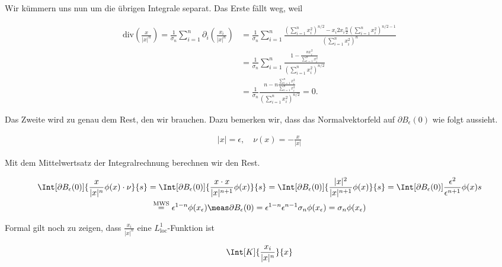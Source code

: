 \begin{solution}
Wir kümmern uns nun um die übrigen Integrale separat.
Das Erste fällt weg, weil

\begin{align*}
  \mathrm{div}\left(\frac{x}{|x|^n}\right)
  =\frac{1}{\sigma_n}\sum_{i=1}^n\partial_i\left(\frac{x_i}{|x|^n}\right)
  &= \frac{1}{\sigma_n}\sum_{i=1}^n\frac{\left(\sum_{i=1}^nx_i^2\right)^{n/2} - x_i2x_i\frac{n}{2}\left(\sum_{i=1}^nx_i^2\right)^{n/2 - 1}}{\left(\sum_{i=1}^nx_i^2\right)^n} \\
  &= \frac{1}{\sigma_n}\sum_{i=1}^n\frac{1 - \frac{nx_i^2}{\sum_{i=1}^nx_i^2}}{\left(\sum_{i=1}^nx_i^2\right)^{n/2}} \\
  &= \frac{1}{\sigma_n}\frac{n - n\frac{\sum_{i=1}^nx_i^2}{\sum_{i=1}^nx_i^2}}{\left(\sum_{i=1}^nx_i^2\right)^{n/2}} = 0.
\end{align*}

Das Zweite wird zu genau dem Rest, den wir brauchen.
Dazu bemerken wir, dass das Normalvektorfeld auf $\partial B_\epsilon(0)$ wie folgt aussieht.

\begin{align*}
  |x| = \epsilon,
  \quad
  \nu(x)
  =
  -\frac{x}{|x|}
\end{align*}

Mit dem Mittelwertsatz der Integralrechnung berechnen wir den Rest.

\begin{multline*}
  \Int
  [\partial B_\epsilon(0)]
  {
    \frac{x}{|x|^n}
    \phi(x)
    \cdot
    \nu
  }{s}
  =
  \Int
  [\partial B_\epsilon(0)]
  {
    \frac{x \cdot x}{|x|^{n+1}}
    \phi(x)
  }{s}
  =
  \Int
  [\partial B_\epsilon(0)]
  {
    \frac{|x|^2}{|x|^{n+1}}
    \phi(x)
  }{s}
  =
  \Int
  [\partial B_{\epsilon}(0)]
  {
    \frac{\epsilon^2}{\epsilon^{n+1}}
    \phi(x)
  }{s} \\
  \stackrel{\text{MWS}}{=}
  \epsilon^{1-n}
  \phi(x_\epsilon)
  \meas \partial B_{\epsilon}(0)
  =
  \epsilon^{1-n}
  \epsilon^{n-1}
  \sigma_n
  \phi(x_\epsilon)
  =
  \sigma_n
  \phi(x_{\epsilon})
\end{multline*}

Formal gilt noch zu zeigen, dass $\frac{x_i}{|x|^n}$ eine $L^1_{\mathrm{loc}}$-Funktion ist

\begin{align*}
  \Int[K]
  {
    \frac{x_i}{|x|^n}
  }{x}
\end{align*}

\end{solution}

